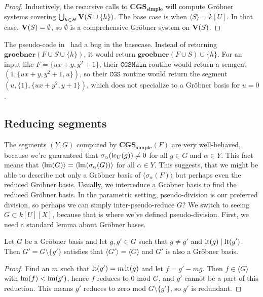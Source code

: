 \begin{proof}
  Inductively, the recursive calls to $\mathbf{CGS_{simple}}$ will compute Gröbner systems covering $\bigcup_{h \in H} \operatorname{\mathbf V}(S \cup \{h\})$. The base case is when $\langle S \rangle = k[U]$. In that case, $\operatorname{\mathbf V}(S) = \emptyset$, so $\emptyset$ is a comprehensive Gröbner system on $\operatorname{\mathbf V}(S)$.
\end{proof}

The pseudo-code in~\cite{ss_algo} had a bug in the basecase. Instead of returning $\mathbf{groebner}(F \cup S \cup \{h\})$, it would return $\mathbf{groebner}(F \cup S) \cup \{h\}$. For an input like $F = \{ux + y, y^{2} + 1\}$, their $\mathtt{CGSMain}$ routine would return a semgent $(1, \{ux + y, y^{2} + 1, u\})$, so their $\mathtt{CGS}$ routine would return the segment $({u}, \{1\}, \{ux + y^{2}, y + 1\})$, which does not specialize to a Gröbner basis for $u = 0$.

\subsection{Reducing segments}
The segments $(Y, G)$ computed by $\mathbf{CGS_{simple}}(F)$ are very well-behaved, because we're guaranteed that $\sigma_{\alpha}(\operatorname{lc}_{U}(g)) \neq 0$ for all $g \in G$ and $\alpha \in Y$. This fact means that $\langle \operatorname{lm}(G) \rangle = \langle \operatorname{lm}(\sigma_{\alpha}(G)) \rangle$ for all $\alpha \in Y$. This suggests, that we might be able to describe not only a Gröbner basis of $\langle \sigma_{\alpha}(F) \rangle$ but perhaps even the reduced Gröbner basis. Usually, we interreduce a Gröbner basis to find the reduced Gröbner basis. In the parametric setting, pseudo-division is our preferred division, so perhaps we can simply inter-pseudo-reduce $G$? We switch to seeing $G \subset k[U][X]$, because that is where we've defined pseudo-division. First, we need a standard lemma about Gröbner bases.

\begin{lemma}\label{lem:redundant}
  Let $G$ be a Gröbner basis and let $g, g' \in G$ such that $g \neq g'$ and $\operatorname{lt}(g) \mid \operatorname{lt}(g')$. Then $G' = G \setminus \{g'\}$ satisfies that $\langle G' \rangle = \langle G \rangle$ and $G'$ is also a Gröbner basis.
\end{lemma}
\begin{proof}
  Find an $m$ such that $\operatorname{lt}(g') = m\operatorname{lt}(g)$ and let $f = g' - mg$. Then $f \in \langle G \rangle$ with $\operatorname{lm}(f) < \operatorname{lm}(g')$, hence $f$ reduces to 0 mod $G$, and $g'$ cannot be a part of this reduction. This means $g'$ reduces to zero mod $G \setminus \{g'\}$, so $g'$ is redundant.
\end{proof}

